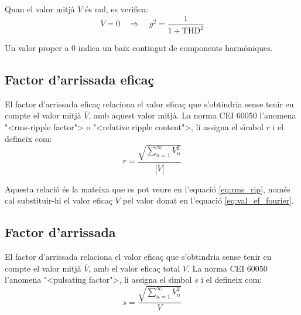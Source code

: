 Quan el valor mitj\`{a} $\bar{V}$ \'{e}s nul, es verifica:
\begin{equation}
   \bar{V}=0 \quad \Rightarrow\quad g^2 = \frac{1}{1+\text{THD}^2}
\end{equation}

Un valor proper a 0 indica un baix contingut de components harm\`{o}niques.

\subsection{Factor d'arrissada efica\c{c}}\label{sec:four_fac_arr_ef}

El factor d'arrissada efica\c{c} relaciona el valor efica\c{c}  que
s'obtindria sense tenir en compte el valor mitj\`{a}  $\bar{V}$, amb aquest
valor mitj\`{a}. La norma \textsf{CEI 60050} l'anomena {"<}rms-ripple factor{">} o {"<}relative ripple content{">}, li assigna el s\'{\i}mbol $r$ i el defineix com:
\begin{equation}
    r = \frac{\sqrt{\displaystyle\sum_{n=1}^\infty V^2_n}}{|\bar{V}|}
\end{equation}

Aquesta relaci\'{o} \'{e}s la mateixa que es pot veure en l'equaci\'{o}  \eqref{eq:rms_rip}, nom\'{e}s cal substituir-hi el valor efica\c{c} $V$ pel valor donat en l'equaci\'{o} \eqref{eq:val_ef_fourier}.

\subsection{Factor d'arrissada}

El factor d'arrissada relaciona el valor efica\c{c}  que
s'obtindria sense tenir en compte el valor mitj\`{a}  $\bar{V}$, amb el
valor efica\c{c} total $V$. La norma \textsf{CEI 60050} l'anomena {"<}pulsating factor{">}, li assigna el s\'{\i}mbol $s$ i el defineix com:
\begin{equation}
    s = \frac{\sqrt{\displaystyle\sum_{n=1}^\infty V^2_n}}{V}
\end{equation}


